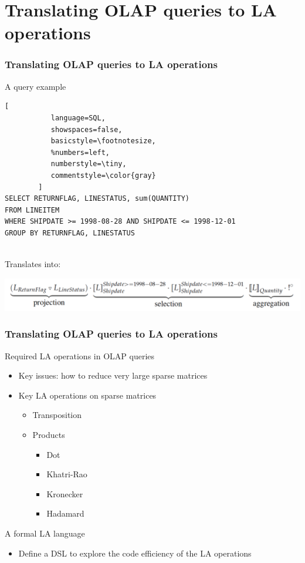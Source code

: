 \documentclass{beamer}
\begin{document}
\section{Translating OLAP queries to LA operations}
\begin{frame}[fragile]
\frametitle{Translating OLAP queries to LA operations}

\begin{block}{A query example}
\begin{lstlisting}[
           language=SQL,
           showspaces=false,
           basicstyle=\footnotesize,
           %numbers=left,
           numberstyle=\tiny,
           commentstyle=\color{gray}
        ]
SELECT RETURNFLAG, LINESTATUS, sum(QUANTITY)
FROM LINEITEM
WHERE SHIPDATE >= 1998-08-28 AND SHIPDATE <= 1998-12-01
GROUP BY RETURNFLAG, LINESTATUS
\end{lstlisting}
\end{block}

\\Translates into:\par 

\includegraphics[width=\textwidth]{images/query_1_la.png}

\end{frame}

\begin{frame}
\frametitle{Translating OLAP queries to LA operations}

\begin{block}{Required LA operations in OLAP queries}

\begin{itemize}
    \item Key issues: how to reduce very large sparse matrices
    \item Key LA operations on sparse matrices
    \begin{itemize}
        \item Transposition
        \item Products
        \begin{itemize}
            \item Dot
            \item Khatri-Rao 
            \item Kronecker 
            \item Hadamard 
        \end{itemize}
    \end{itemize}
\end{itemize}
\end{block}

\begin{block}{A formal LA language}
    \begin{itemize}
        \item Define a DSL to explore the code efficiency of the LA operations
    \end{itemize}
\end{block}
\end{frame}
\end{document}
